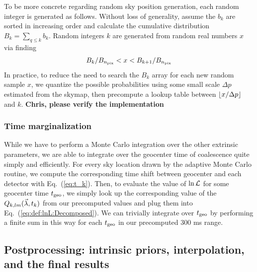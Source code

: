 To be more concrete regarding random sky position generation, each random integer is generated as follows. 
%
Without loss of generality, assume the $b_k$ are sorted in increasing order and calculate the cumulative distribution $B_k
= \sum_{q\le k} b_k$.   Random integers $k$ are generated from random real numbers $x$ via finding
\begin{eqnarray}
 B_k/B_{n_{\rm pix}} < x <  B_{k+1}/B_{n_{\rm pix}}
\end{eqnarray}
In practice, to reduce the need to search the $B_k$ array for each new random sample $x$, we quantize the possible probabilities
using some small scale $\Delta p$ estimated from the skymap, then  precompute a lookup table between $\floor*{x/\Delta
  p}$ and $k$.    \textbf{Chris, please verify the implementation}





\subsubsection{Time marginalization}

While we have to perform a Monte Carlo integration over the other extrinsic parameters, we are able to
integrate over the geocenter time of coalescence quite simply and efficiently.
For every sky location drawn by the adaptive Monte Carlo routine, we compute the
corresponding time shift between geocenter and each detector with Eq.~(\ref{eq:t_k}).
Then, to evaluate the value of $\ln {\cal L}$ for some geocenter time $t_{\rm geo}$,
we simply look up the corresponding value of the $Q_{k,lm}(\itrprm,t_k)$ from our precomputed values and plug them
into Eq.~(\ref{eq:def:lnL:Decomposed}).
We can trivially integrate over $t_{\rm geo}$ by performing a finite sum in this way 
for each $t_{\rm geo}$ in our precomputed $300$ ms range.





\subsection{Postprocessing: intrinsic priors, interpolation, and the final results}

